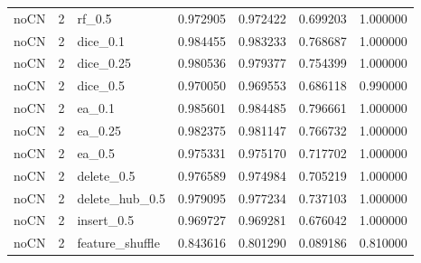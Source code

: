 \documentclass[UTF8,a4paper,11pt,fontset=fandol]{ctexart}
\begin{document}
{\begin{longtable}{lrlrrrr}
noCN & 2 & rf\_0.5 & 0.972905 & 0.972422 & 0.699203 & 1.000000 \\
noCN & 2 & dice\_0.1 & 0.984455 & 0.983233 & 0.768687 & 1.000000 \\
noCN & 2 & dice\_0.25 & 0.980536 & 0.979377 & 0.754399 & 1.000000 \\
noCN & 2 & dice\_0.5 & 0.970050 & 0.969553 & 0.686118 & 0.990000 \\
noCN & 2 & ea\_0.1 & 0.985601 & 0.984485 & 0.796661 & 1.000000 \\
noCN & 2 & ea\_0.25 & 0.982375 & 0.981147 & 0.766732 & 1.000000 \\
noCN & 2 & ea\_0.5 & 0.975331 & 0.975170 & 0.717702 & 1.000000 \\
noCN & 2 & delete\_0.5 & 0.976589 & 0.974984 & 0.705219 & 1.000000 \\
noCN & 2 & delete\_hub\_0.5 & 0.979095 & 0.977234 & 0.737103 & 1.000000 \\
noCN & 2 & insert\_0.5 & 0.969727 & 0.969281 & 0.676042 & 1.000000 \\
noCN & 2 & feature\_shuffle & 0.843616 & 0.801290 & 0.089186 & 0.810000 \\
\end{longtable}
}
\end{document}
